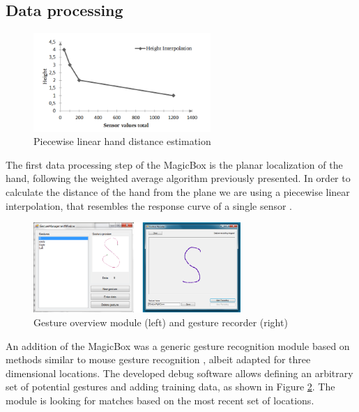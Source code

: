 \subsection{Data processing}
 \begin{figure}[h]
\centering
\includegraphics[width=0.6\textwidth]{images/magicbox_data_zaxis}
\caption{Piecewise linear hand distance estimation \cite{Braun2011MultiInputDevice}}
\label{fig:magicbox_data_zaxis}
\end{figure}
The first data processing step of the MagicBox is the planar localization of the hand, following the weighted average algorithm previously presented. In order to calculate the distance of the hand from the plane we are using a piecewise linear interpolation, that resembles the response curve of a single sensor \cite{Braun2011MultiInputDevice}.
\begin{figure}[h]
\centering
\includegraphics[width=0.7\textwidth]{images/magicbox_data_gest}
\caption{Gesture overview module (left) and gesture recorder (right)}
\label{fig:magicbox_data_gest}
\end{figure}
An addition of the MagicBox was a generic gesture recognition module based on methods similar to mouse gesture recognition \cite{braun2013capacitive}, albeit adapted for three dimensional locations. The developed debug software allows defining an arbitrary set of potential gestures and adding training data, as shown in Figure \ref{fig:magicbox_data_gest}. The module is looking for matches based on the most recent set of locations. 
